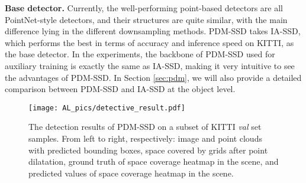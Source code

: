 \textbf{Base detector.} Currently, the well-performing point-based detectors are all PointNet-style detectors, and their structures are quite similar, with the main difference lying in the different downsampling methods. PDM-SSD takes IA-SSD, which performs the best in terms of accuracy and inference speed on KITTI, as the base detector. In the experiments, the backbone of PDM-SSD used for auxiliary training is exactly the same as IA-SSD, making it very intuitive to see the advantages of PDM-SSD. In Section \ref{sec:pdm}, we will also provide a detailed comparison between PDM-SSD and IA-SSD at the object level.

\begin{figure}
	\centering
	\texttt{[image: AL\_pics/detective\_result.pdf]}
	\caption{The detection results of PDM-SSD on a subset of KITTI \textit{val} set samples. From left to right, respectively: image and point clouds with predicted bounding boxes, space covered by grids after point dilatation, ground truth of space coverage heatmap in the scene, and predicted values of space coverage heatmap in the scene.}
	\label{fig:detectiveresult}
\end{figure}